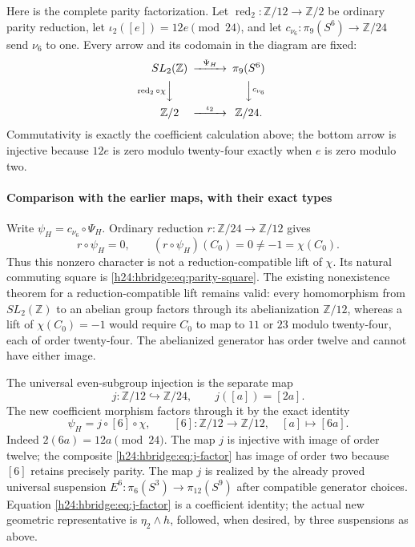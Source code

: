 Here is the complete parity factorization. Let
\(\operatorname{red}_2:\mathbb Z/12\to\mathbb Z/2\) be
ordinary parity reduction, let
\(\iota_2([e])=12e\pmod{24}\), and let
\(c_{\nu_6}:\pi_9(S^6)\to\mathbb Z/24\) send \(\nu_6\)
to one. Every arrow and its codomain in the diagram are fixed:
\begin{equation}
\begin{CD}
SL_2(\mathbb Z) @>{\Psi_H}>> \pi_9(S^6)\\
@V{\operatorname{red}_2\circ\chi}VV @VV{c_{\nu_6}}V\\
\mathbb Z/2 @>{\iota_2}>> \mathbb Z/24.
\end{CD}
\label{h24:hbridge:eq:parity-square}
\end{equation}
Commutativity is exactly the coefficient calculation above; the
bottom arrow is injective because \(12e\) is zero modulo
twenty-four exactly when \(e\) is zero modulo two.

\paragraph{Comparison with the earlier maps, with their exact types}

Write \(\psi_H=c_{\nu_6}\circ\Psi_H\). Ordinary reduction
\(r:\mathbb Z/24\to\mathbb Z/12\) gives
\begin{equation}
r\circ\psi_H=0,
\qquad (r\circ\psi_H)(C_0)=0\ne-1=\chi(C_0).
\label{h24:hbridge:eq:not-lift}
\end{equation}
Thus this nonzero character is not a reduction-compatible lift of
\(\chi\). Its natural commuting square is
\eqref{h24:hbridge:eq:parity-square}. The existing nonexistence
theorem for a reduction-compatible lift remains valid: every
homomorphism from \(SL_2(\mathbb Z)\) to an abelian group
factors through its abelianization \(\mathbb Z/12\), whereas
a lift of \(\chi(C_0)=-1\) would require \(C_0\) to map
to \(11\) or \(23\) modulo twenty-four, each of order
twenty-four. The abelianized generator has order twelve and
cannot have either image.

The universal even-subgroup injection is the separate map
\[
j:\mathbb Z/12\hookrightarrow\mathbb Z/24,
\qquad j([a])=[2a].
\]
The new coefficient morphism factors through it by the exact
identity
\begin{equation}
\psi_H=j\circ[6]\circ\chi,
\qquad [6]:\mathbb Z/12\longrightarrow\mathbb Z/12,
\quad [a]\longmapsto[6a].
\label{h24:hbridge:eq:j-factor}
\end{equation}
Indeed \(2(6a)=12a\pmod{24}\). The map \(j\) is
injective with image of order twelve; the composite
\eqref{h24:hbridge:eq:j-factor} has image of order two because
\([6]\) retains precisely parity. The map \(j\) is realized
by the already proved universal suspension
\(E^6:\pi_6(S^3)\to\pi_{12}(S^9)\) after compatible
generator choices. Equation \eqref{h24:hbridge:eq:j-factor} is a
coefficient identity; the actual new geometric representative is
\(\eta_2\wedge h\), followed, when desired, by three
suspensions as above.

